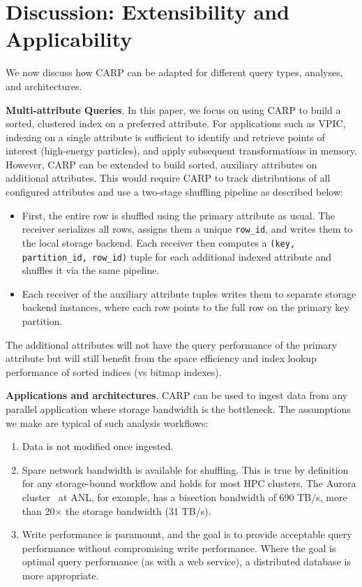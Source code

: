 \section{Discussion: Extensibility and Applicability}
\label{sec:carp:disc}

We now discuss how CARP can be adapted for different query types, analyses, and
architectures.

\textbf{Multi-attribute Queries}.
In this paper, we focus on using CARP to build a sorted, clustered index on a preferred attribute.
For applications such as VPIC, indexing on a single attribute is sufficient to identify and
retrieve points of interest (high-energy particles), and apply subsequent transformations in
memory.
However, CARP can be extended to build sorted, auxiliary attributes on additional attributes.
This would require CARP to track distributions of all configured attributes and use a two-stage
shuffling pipeline as described below:

\begin{itemize}
  \item First, the entire row is shuffled using the primary attribute as usual.
        The receiver serializes all rows, assigns them a unique \texttt{row\_id}, and writes them to the
        local storage backend.
        Each receiver then computes a \texttt{(key, partition\_id, row\_id)} tuple for each additional
        indexed attribute and shuffles it via the same pipeline.
  \item Each receiver of the auxiliary attribute tuples writes them to separate storage backend
        instances, where each row points to the full row on the primary key partition.
\end{itemize}

The additional attributes will not have the query performance of the primary attribute but will
still benefit from the space efficiency and index lookup performance of sorted indices (vs bitmap
indexes).

\textbf{Applications and architectures}.
CARP can be used to ingest data from any parallel application where storage bandwidth is the
bottleneck.
The assumptions we make are typical of such analysis workflows:

\begin{enumerate}
  \item Data is not modified once ingested.
  \item Spare network bandwidth is available for shuffling.
        This is true by definition for any storage-bound workflow and holds for most HPC clusters.
        The Aurora cluster~\cite{Morga2023:AuroraRising} at ANL, for example, has a bisection bandwidth of
        690 TB/s, more than 20$\times$ the storage bandwidth (31 TB/s).
  \item Write performance is paramount, and the goal is to provide acceptable query performance
        without compromising write performance.
        Where the goal is optimal query performance (as with a web service), a distributed database is more
        appropriate.
\end{enumerate}

